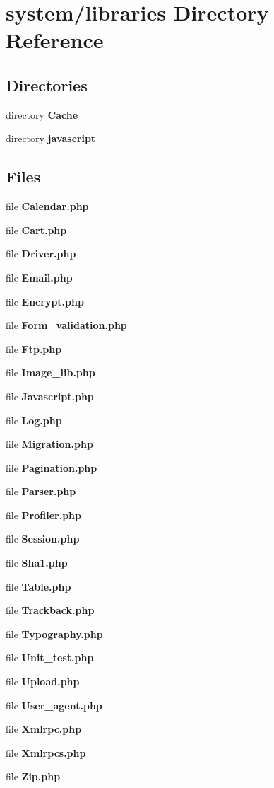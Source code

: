 \section{system/libraries Directory Reference}
\label{dir_8be706dbb16eeac720280ce643b12a1b}
\subsection*{Directories}
\begin{DoxyCompactItemize}
\item 
directory {\bf Cache}
\item 
directory {\bf javascript}
\end{DoxyCompactItemize}
\subsection*{Files}
\begin{DoxyCompactItemize}
\item 
file {\bf Calendar.\-php}
\item 
file {\bf Cart.\-php}
\item 
file {\bf Driver.\-php}
\item 
file {\bf Email.\-php}
\item 
file {\bf Encrypt.\-php}
\item 
file {\bf Form\-\_\-validation.\-php}
\item 
file {\bf Ftp.\-php}
\item 
file {\bf Image\-\_\-lib.\-php}
\item 
file {\bf Javascript.\-php}
\item 
file {\bf Log.\-php}
\item 
file {\bf Migration.\-php}
\item 
file {\bf Pagination.\-php}
\item 
file {\bf Parser.\-php}
\item 
file {\bf Profiler.\-php}
\item 
file {\bf Session.\-php}
\item 
file {\bf Sha1.\-php}
\item 
file {\bf Table.\-php}
\item 
file {\bf Trackback.\-php}
\item 
file {\bf Typography.\-php}
\item 
file {\bf Unit\-\_\-test.\-php}
\item 
file {\bf Upload.\-php}
\item 
file {\bf User\-\_\-agent.\-php}
\item 
file {\bf Xmlrpc.\-php}
\item 
file {\bf Xmlrpcs.\-php}
\item 
file {\bf Zip.\-php}
\end{DoxyCompactItemize}
